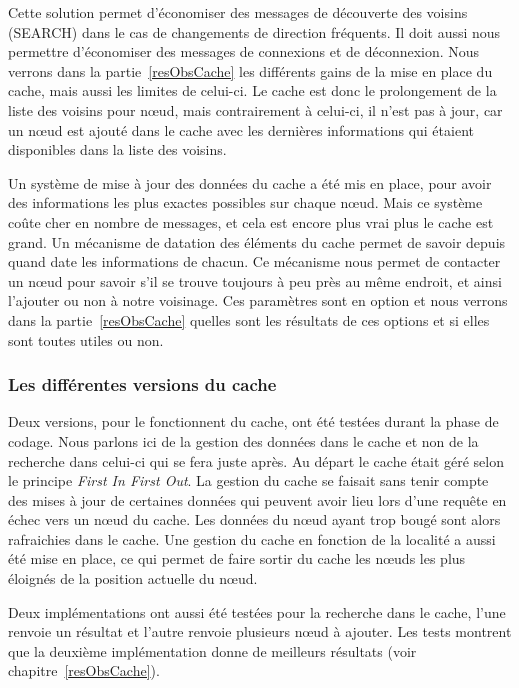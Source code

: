 \par Cette solution permet d'économiser des messages de découverte des voisins (SEARCH) dans le cas de changements de direction fréquents. Il doit aussi nous permettre d'économiser des messages de connexions et de déconnexion. Nous verrons dans la partie~\ref{resObsCache} les différents gains de la mise en place du cache, mais aussi les limites de celui-ci. Le cache est donc le prolongement de la liste des voisins pour nœud, mais contrairement à celui-ci, il n'est pas à jour, car un nœud est ajouté dans le cache avec les dernières informations qui étaient disponibles dans la liste des voisins. 
\par Un système de mise à jour des données du cache a été mis en place, pour avoir des informations les plus exactes possibles sur chaque nœud. Mais ce système coûte cher en nombre de messages, et cela est encore plus vrai plus le cache est grand. Un mécanisme de datation des éléments du cache permet de savoir depuis quand date les informations de chacun. Ce mécanisme nous permet de contacter un nœud pour savoir s'il se trouve toujours à peu près au même endroit, et ainsi l'ajouter ou non à notre voisinage. Ces paramètres sont en option et nous verrons dans la partie~\ref{resObsCache} quelles sont les résultats de ces options et si elles sont toutes utiles ou non.

\subsubsection{Les différentes versions du cache}

Deux versions, pour le fonctionnent du cache, ont été testées durant la phase de codage. Nous parlons ici de la gestion des données dans le cache et non de la recherche dans celui-ci qui se fera juste après. Au départ le cache était géré selon le principe \textit{First In First Out}. La gestion du cache se faisait sans tenir compte des mises à jour de certaines données qui peuvent avoir lieu lors d'une requête en échec vers un nœud du cache. Les données du nœud ayant trop bougé sont alors rafraichies dans le cache. Une gestion du cache en fonction de la localité a aussi été mise en place, ce qui permet de faire sortir du cache les nœuds les plus éloignés de la position actuelle du nœud.
\par Deux implémentations ont aussi été testées pour la recherche dans le cache, l'une renvoie un résultat et l'autre renvoie plusieurs nœud à ajouter. Les tests montrent que la deuxième implémentation donne de meilleurs résultats (voir chapitre~\ref{resObsCache}).



